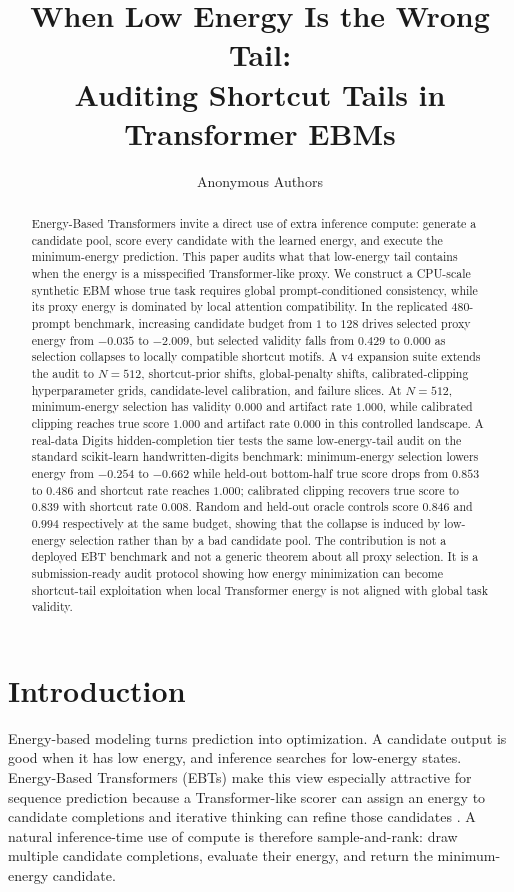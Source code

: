 \documentclass{article}
\title{When Low Energy Is the Wrong Tail:\\
Auditing Shortcut Tails in Transformer EBMs}
\author{Anonymous Authors}
\begin{document}
\maketitle

\begin{abstract}
Energy-Based Transformers invite a direct use of extra inference compute:
generate a candidate pool, score every candidate with the learned energy, and
execute the minimum-energy prediction. This paper audits what that low-energy
tail contains when the energy is a misspecified Transformer-like proxy. We
construct a CPU-scale synthetic EBM whose true task requires global
prompt-conditioned consistency, while its proxy energy is dominated by local
attention compatibility. In the replicated 480-prompt benchmark, increasing
candidate budget from $1$ to $128$ drives selected proxy energy from $-0.035$
to $-2.009$, but selected validity falls from $0.429$ to $0.000$ as selection
collapses to locally compatible shortcut motifs. A v4 expansion suite extends
the audit to $N=512$, shortcut-prior shifts, global-penalty shifts,
calibrated-clipping hyperparameter grids, candidate-level calibration, and
failure slices. At $N=512$, minimum-energy selection has validity $0.000$ and
artifact rate $1.000$, while calibrated clipping reaches true score $1.000$ and
artifact rate $0.000$ in this controlled landscape. A real-data Digits
hidden-completion tier tests the same low-energy-tail audit on the standard
scikit-learn handwritten-digits benchmark: minimum-energy selection lowers
energy from $-0.254$ to $-0.662$ while held-out bottom-half true score drops
from $0.853$ to $0.486$ and shortcut rate reaches $1.000$; calibrated clipping
recovers true score to $0.839$ with shortcut rate $0.008$. Random and held-out
oracle controls score $0.846$ and $0.994$ respectively at the same budget,
showing that the collapse is induced by low-energy selection rather than by a
bad candidate pool. The contribution is not a
deployed EBT benchmark and not a generic theorem about all proxy selection. It
is a submission-ready audit protocol showing how energy minimization can become
shortcut-tail exploitation when local Transformer energy is not aligned with
global task validity.
\end{abstract}

\section{Introduction}

Energy-based modeling turns prediction into optimization. A candidate output
is good when it has low energy, and inference searches for low-energy states.
Energy-Based Transformers (EBTs) make this view especially attractive for
sequence prediction because a Transformer-like scorer can assign an energy to
candidate completions and iterative thinking can refine those candidates
\citep{gladstone2026ebt}. A natural inference-time use of compute is therefore
sample-and-rank: draw multiple candidate completions, evaluate their energy,
and return the minimum-energy candidate.
\end{document}
